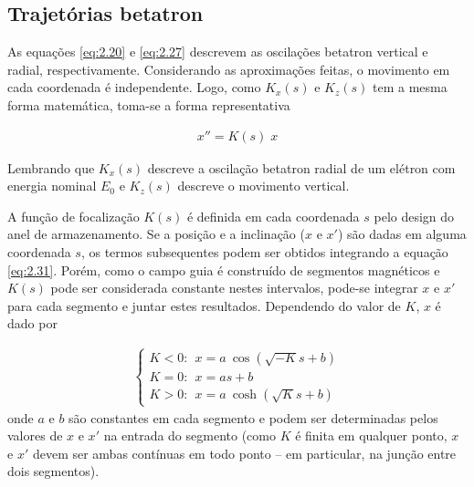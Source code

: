 \subsection{Trajetórias betatron}
As equações \eqref{eq:2.20} e \eqref{eq:2.27} descrevem as oscilações betatron vertical e radial, respectivamente. Considerando as aproximações feitas, o movimento em cada coordenada é independente. Logo, como $K_x(s)$ e $K_z(s)$ tem a mesma forma matemática, toma-se a forma representativa
	
\begin{align}
	x'' = K(s) \; x \label{eq:2.31}
\end{align}
	
Lembrando que $K_x(s)$ descreve a oscilação betatron radial de um elétron com energia nominal $E_0$ e $K_z(s)$ descreve o movimento vertical.
	
A função de focalização $K(s)$ é definida em cada coordenada $s$ pelo design do anel de armazenamento. Se a posição e a inclinação ($x$ e $x'$) são dadas em alguma coordenada $s$, os termos subsequentes podem ser obtidos integrando a equação \eqref{eq:2.31}. Porém, como o campo guia é construído de segmentos magnéticos e $K(s)$ pode ser considerada constante nestes intervalos, pode-se integrar $x$ e $x'$ para cada segmento e juntar estes resultados. Dependendo do valor de $K$, $x$ é dado por

\begin{align}
	\left\{\begin{array}{l}
	K<0: \ \ x = a\ \cos(\sqrt{-K}s+b) \\
	K=0: \ \ x = as+b \\
	K>0: \ \ x = a\ \cosh(\sqrt{K}s+b)
	\end{array}\right. \label{eq:2.32}
\end{align}
onde $a$ e $b$ são constantes em cada segmento e podem ser determinadas pelos valores de $x$ e $x'$ na entrada do segmento (como $K$ é finita em qualquer ponto, $x$ e $x'$ devem ser ambas contínuas em todo ponto -- em particular, na junção entre dois segmentos).
	
